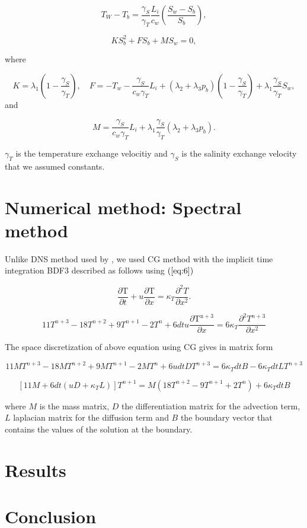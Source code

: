 \documentclass[11pt,a4paper]{article}
\begin{document}
	\begin{equation}
		\label{eq:13}
		T_W-T_b = \dfrac{\gamma_S}{\gamma_T} \dfrac{L_i}{c_w}\left(\dfrac{S_w-S_b}{S_b}\right),
	\end{equation}

	\begin{equation}
		\label{eq:14}
		KS_b^2+FS_b+MS_w = 0,
	\end{equation}
	
	where
	
	$$K = \lambda_1\left(1-\dfrac{\gamma_S}{\gamma_T}\right), \quad F = -T_w-\dfrac{\gamma_S}{c_w\gamma_T}L_i+(\lambda_2+\lambda_3p_b)\left(1-\dfrac{\gamma_S}{\gamma_T}\right)+\lambda_1\dfrac{\gamma_S}{\gamma_T}S_w,$$
	and
	
	$$M = \dfrac{\gamma_S}{c_w\gamma_T}L_i+\lambda_1\dfrac{\gamma_S}{\gamma_T}(\lambda_2+\lambda_3p_b).$$
	
	$\gamma_T$ is the temperature exchange velocitiy and $\gamma_S$ is the salinity exchange velocity that we assumed constants.
	
	\section{Numerical method: Spectral method}
	
	Unlike DNS method used by \cite{gayen2016simulation}, we used CG method with the implicit time integration BDF3 described as follows using $(\ref{eq:6})$
	
	$$\dfrac{\partial\mathrm{T}}{\partial t} +u	\dfrac{\partial\mathrm{T}}{\partial x} = \kappa_T\dfrac{\partial^2T}{\partial x^2}.$$
	
	$$11T^{n+3} -18T^{n+2} + 9T^{n+1} -2T^{n} + 6dtu	\dfrac{\partial\mathrm{T^{n+3}}}{\partial x}  = 6\kappa_T\dfrac{\partial^2T^{n+3}}{\partial x^2}$$
	
	The space discretization of above equation using CG gives in matrix form 
	
	$$11MT^{n+3} -18MT^{n+2} + 9MT^{n+1} -2MT^{n}+6udtDT^{n+3} = 6\kappa_TdtB -6\kappa_T dtLT^{n+3}$$
	
	$$\left[11M+6dt(uD+\kappa_TL)\right]T^{n+1} = M\left(18T^{n+2}-9T^{n+1}+2T^{n}\right) + 6\kappa_TdtB$$
	
	where $M$ is the mass matrix, $D$ the differentiation matrix for the advection term, $L$ laplacian matrix for the diffusion term and $B$ the boundary vector that contains the values of the solution at the boundary.
	
	
	\section{Results}
	
	\section{Conclusion}
	
	
	
	
	
	
	\newpage
	
	
	
\end{document}
